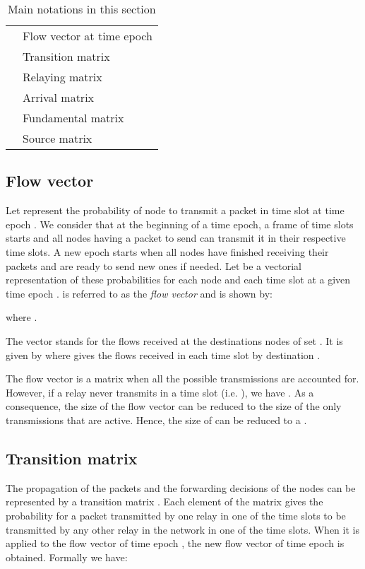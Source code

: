\documentclass[a4paper]{article}
\begin{document}
\begin{table} 
\caption{Main notations in this section} 
\centering
\label{tab:notations2}
\begin{tabular}{| c | l |}
\hline
	& Flow vector at time epoch  \\
		& Transition matrix \\
		& Relaying matrix \\
		& Arrival matrix \\
		& Fundamental matrix \\
		& Source matrix \\
\hline

\end{tabular}
\end{table}
  
  
\subsection{Flow vector}
Let  represent the probability of node  to transmit a packet in time slot  at time epoch . We consider that at the beginning of a time epoch, a frame of  time slots starts and all nodes having a packet to send can transmit it in their respective time slots. A new epoch starts when all nodes have finished receiving their packets and are ready to send new ones if needed. 
Let  be a vectorial representation of these probabilities for each node and each time slot at a given time epoch . 
 is referred to as the \emph{flow vector} and is shown by:

\noindent where .

The vector  stands for the flows received at the destinations nodes of set . 
It is given by  where  gives the flows received in each time slot by destination  .

The flow vector is a  matrix when all the possible transmissions are accounted for. However, if a relay  never transmits in a time slot  (i.e. ), we have .    
As a consequence, the size of the flow vector can be reduced to the size of the only transmissions that are active. Hence, the size of  can be reduced to a .

\subsection{Transition matrix}
The propagation of the packets and the forwarding decisions of the nodes can be represented by a transition matrix .
Each element of the matrix  gives the probability for a packet transmitted by one relay in one of the time slots to be transmitted by any other relay in the network in one of the time slots.   
When it is applied to the flow vector of time epoch , the new flow vector of time epoch  is obtained. Formally we have:
  
\end{document}
